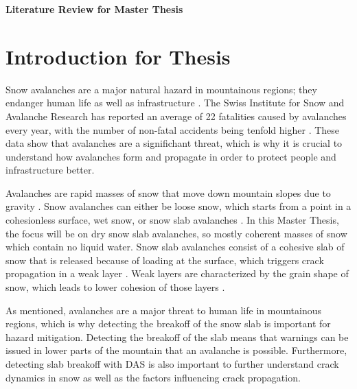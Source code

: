 \documentclass[10pt]{article}
\begin{document}
{\centering \Large \textbf{Literature Review for Master Thesis}\par}

\section{Introduction for Thesis}


Snow avalanches are a major natural hazard in mountainous regions; they endanger human life as well as infrastructure \parencite{schweizerSnowAvalancheFormation2003}. The Swiss Institute for Snow and Avalanche Research has reported an average of 22 fatalities caused by avalanches every year, with the number of non-fatal accidents being tenfold higher \parencite{LongtermStatistics}. These data show that avalanches are a significhant threat, which is why it is crucial to understand how avalanches form and propagate in order to protect people and infrastructure better.

  Avalanches are rapid masses of snow that move down mountain slopes due to gravity \parencite{anceySnowAvalanches2001}. Snow avalanches can either be loose snow, which starts from a point in a cohesionless surface, wet snow, or snow slab avalanches \parencite{schweizerSnowAvalancheFormation2003}. In this Master Thesis, the focus will be on dry snow slab avalanches, so mostly coherent masses of snow which contain no liquid water. Snow slab avalanches consist of a cohesive slab of snow \parencite{schweizerSnowAvalancheFormation2003} that is released because of loading at the surface, which triggers crack propagation in a weak layer \parencite{gaumeSnowFractureRelation2017a}. Weak layers are characterized by the grain shape of snow, which leads to lower cohesion of those layers \parencite{fohnMechanicalStructuralProperties1998}. 


As mentioned, avalanches are a major threat to human life in mountainous regions, which is why detecting the breakoff of the snow slab is important for hazard mitigation. Detecting the breakoff of the slab means that warnings can be issued in lower parts of the mountain that an avalanche is possible. Furthermore, detecting slab breakoff with DAS is also important to further understand crack dynamics in snow as well as the factors influencing crack propagation. \par
\end{document}
